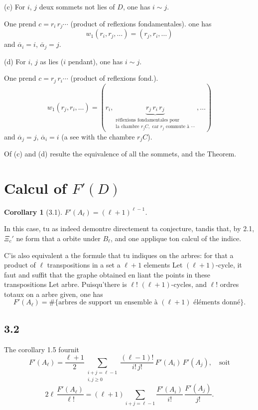 \documentclass[11pt,a4paper]{article}
\theoremstyle{plain}
\newtheorem{corollary}[theorem]{Corollary}
\theoremstyle{definition}
\begin{document}
\smallskip

(c) For $i$, $j$ deux sommets not lies of $D$, one has $i \sim j$.

One prend $c = r_i\, r_j \cdots$ (product of reflexions fondamentales). one has
\[
w_1(r_i, r_j, \ldots) = (r_j, r_i, \ldots)
\]
and $\overline{\alpha}_i = i$, $\overline{\alpha}_j = j$.

\smallskip

(d) For $i$, $j$ as lies ($i$ pendant), one has $i \sim j$.

One prend $c = r_j\, r_i \cdots$ (product of reflexions fond.).
\[
w_1(r_j, r_i, \ldots) = (r_i, \underbrace{r_j\, r_i\, r_j}_{\substack{\text{r\'eflexions fondamentales pour} \\ \text{la chambre } r_j C, \text{ car } r_j \text{ commute \`a } \cdots}}, \ldots)
\]
and $\overline{\alpha}_j = j$, $\overline{\alpha}_i = i$ (a see with the chambre $r_j C$).

\bigskip

Of (c) and (d) resulte the equivalence of all the sommets, and the Theorem.

\newpage

\section{Calcul of $F'(D)$}

\begin{corollary}[3.1]
$F'(A_\ell) = (\ell+1)^{\ell-1}$.
\end{corollary}

In this case, tu as indeed demontre directement ta conjecture, tandis that, by 2.1, $\Xi_c'$ ne form that a orbite under $B_\ell$, and one applique ton calcul of the indice.

C'is also equivalent a the formule that tu indiques on the arbres: for that a product of $\ell$ transpositions in a set a $\ell+1$ elements Let $(\ell+1)$-cycle, it faut and suffit that the graphe obtained en liant the points in these transpositions Let arbre. Puisqu'there is $\ell!$ $(\ell+1)$-cycles, and $\ell!$ ordres totaux on a arbre given, one has
\[
F'(A_\ell) = \#\{\text{arbres de support un ensemble \`a } (\ell+1) \text{ \'el\'ements donn\'e}\}.
\]

\subsection*{3.2}

The corollary 1.5 fournit
\[
F'(A_\ell) = \frac{\ell+1}{2} \sum_{\substack{i+j=\ell-1 \\ i,j \geq 0}} \frac{(\ell-1)!}{i!\, j!}\, F'(A_i)\, F'(A_j), \quad \text{soit}
\]
\[
2\ell \, \frac{F'(A_\ell)}{\ell!} = (\ell+1) \sum_{i+j=\ell-1} \frac{F'(A_i)}{i!}\, \frac{F'(A_j)}{j!}.
\]
\end{document}
